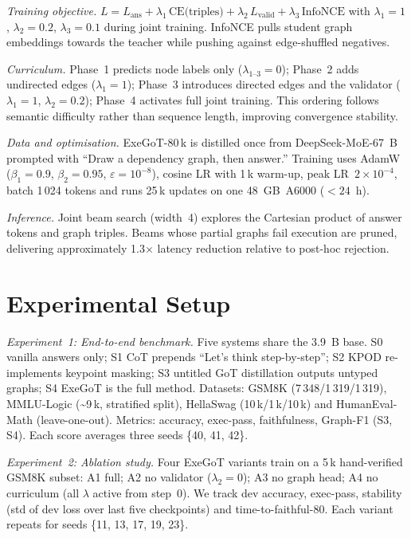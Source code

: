 \documentclass{article} %
\begin{document}
\textit{Training objective.} $L=L_{\text{ans}}+\lambda_{1}\,\text{CE(triples)}+\lambda_{2}\,L_{\text{valid}}+\lambda_{3}\,\text{InfoNCE}$ with $\lambda_{1}=1$, $\lambda_{2}=0.2$, $\lambda_{3}=0.1$ during joint training. InfoNCE pulls student graph embeddings towards the teacher while pushing against edge-shuffled negatives.

\textit{Curriculum.} Phase~1 predicts node labels only ($\lambda_{1\text{--}3}=0$); Phase~2 adds undirected edges ($\lambda_{1}=1$); Phase~3 introduces directed edges and the validator ($\lambda_{1}=1$, $\lambda_{2}=0.2$); Phase~4 activates full joint training. This ordering follows semantic difficulty rather than sequence length, improving convergence stability.

\textit{Data and optimisation.} ExeGoT-80\,k is distilled once from DeepSeek-MoE-67~B prompted with ``Draw a dependency graph, then answer.'' Training uses AdamW ($\beta_{1}=0.9$, $\beta_{2}=0.95$, $\varepsilon=10^{-8}$), cosine LR with 1\,k warm-up, peak LR~$2\times10^{-4}$, batch 1\,024 tokens and runs 25\,k updates on one 48~GB~A6000 ($<24$~h).

\textit{Inference.} Joint beam search (width~4) explores the Cartesian product of answer tokens and graph triples. Beams whose partial graphs fail execution are pruned, delivering approximately 1.3$\times$ latency reduction relative to post-hoc rejection.

\section{Experimental Setup}
\label{sec:experimental}
\textit{Experiment~1: End-to-end benchmark.} Five systems share the 3.9~B base. S0 vanilla answers only; S1 CoT prepends ``Let’s think step-by-step''; S2 KPOD re-implements keypoint masking; S3 untitled GoT distillation outputs untyped graphs; S4 ExeGoT is the full method. Datasets: GSM8K (7\,348/1\,319/1\,319), MMLU-Logic (\textasciitilde9\,k, stratified split), HellaSwag (10\,k/1\,k/10\,k) and HumanEval-Math (leave-one-out). Metrics: accuracy, exec-pass, faithfulness, Graph-F1 (S3, S4). Each score averages three seeds \{40, 41, 42\}.

\textit{Experiment~2: Ablation study.} Four ExeGoT variants train on a 5\,k hand-verified GSM8K subset: A1 full; A2 no validator ($\lambda_{2}=0$); A3 no graph head; A4 no curriculum (all $\lambda$ active from step~0). We track dev accuracy, exec-pass, stability (std of dev loss over last five checkpoints) and time-to-faithful-80. Each variant repeats for seeds \{11, 13, 17, 19, 23\}.
\end{document}
